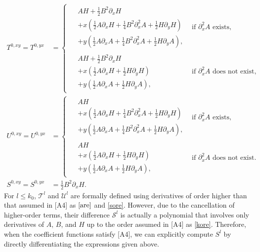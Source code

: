 \documentclass[a4paper,11pt]{jsarticle}
\begin{document}
\begin{align}
    T^{0,xy} = T^{0,yx} &= \begin{cases}
         \begin{aligned}
&  AH + \frac{1}{2} B^2 \partial_x H \\&+ x ( \frac{1}{2}A  \partial_x H  + \frac{1}{4} B^2 \partial_x^2 A + \frac{1}{2} H \partial_y H) \\ & + y (  \frac{1}{2}A \partial_x A + \frac{1}{4}B^2 \partial_x^2 A  +  \frac{1}{2}H \partial_y A),
\end{aligned} & \text{if } \partial_x^2 A \text{ exists,} \\    \begin{aligned}
&  AH + \frac{1}{2} B^2 \partial_x H \\&+ x ( \frac{1}{2}A  \partial_x H  + \frac{1}{2} H \partial_y H) \\ & + y (  \frac{1}{2}A \partial_x A  +   \frac{1}{2}H \partial_y A) 
,\end{aligned}&  \text{if } \partial_x^2 A \text{ does not exist,}
    \end{cases} \\   U^{0,xy} = U^{0,yx} &= \begin{cases}
         \begin{aligned}
&  AH \\&+ x ( \frac{1}{2}A  \partial_x H  + \frac{1}{4} B^2 \partial_x^2 A + \frac{1}{2} H \partial_y H) \\ & + y (  \frac{1}{2}A \partial_x A + \frac{1}{4}B^2 \partial_x^2 A  +  \frac{1}{2}H \partial_y A)
,\end{aligned} & \text{if } \partial_x^2 A \text{ exists,} \\    \begin{aligned}
&  AH\\&+ x ( \frac{1}{2}A  \partial_x H  + \frac{1}{2} H \partial_y H) \\ & + y (  \frac{1}{2}A \partial_x A  +   \frac{1}{2}H \partial_y A)
,\end{aligned}&  \text{if } \partial_x^2 A \text{ does not exist.}
    \end{cases} \\  S^{0,xy} = S^{0,yx} &= \frac{1}{2} B^2  \partial_x H.
\end{align}
For $l \leq k_0$, $\mathscr{T}^l$ and $\mathscr{U}^l$ are formally defined using derivatives of order higher than that assumed in [A4] as $\eqref{are}$ and \eqref{sore}. However, due to the cancellation of higher-order terms, their difference $\mathscr{S}^l$ is actually a polynomial that involves only derivatives of $A$, $B$, and $H$ up to the order assumed in [A4] as \eqref{kore}. Therefore, when the coefficient functions satisfy [A4], we can explicitly compute $S^l$ by directly differentiating the expressions given above.
\end{document}
